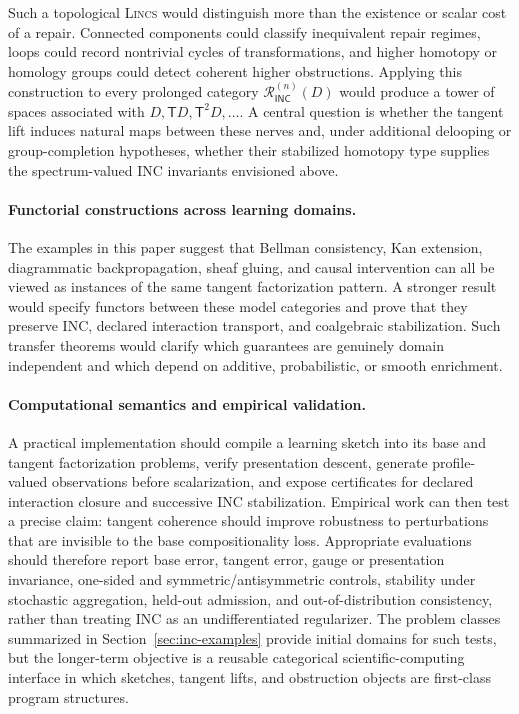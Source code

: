 \documentclass{article}
\newcommand{\T}{\mathsf{T}}
\newcommand{\INC}{\mathsf{INC}}
\begin{document}
Such a topological \textsc{Lincs}   would distinguish more than the existence or scalar
cost of a repair.  Connected components could classify inequivalent repair
regimes, loops could record nontrivial cycles of transformations, and higher
homotopy or homology groups could detect coherent higher obstructions.  Applying
this construction to every prolonged category
$\mathcal R_{\INC}^{(n)}(D)$ would produce a tower of spaces associated with
$D,\T D,\T^2D,\ldots$.  A central question is whether the tangent lift induces
natural maps between these nerves and, under additional delooping or
group-completion hypotheses, whether their stabilized homotopy type supplies
the spectrum-valued INC invariants envisioned above.

\paragraph{Functorial constructions across learning domains.}
The examples in this paper suggest that Bellman consistency, Kan extension,
diagrammatic backpropagation, sheaf gluing, and causal intervention can all be
viewed as instances of the same tangent factorization pattern.  A stronger
result would specify functors between these model categories and prove that
they preserve INC, declared interaction transport, and coalgebraic stabilization.  Such
transfer theorems would clarify which guarantees are genuinely domain
independent and which depend on additive, probabilistic, or smooth enrichment.

\paragraph{Computational semantics and empirical validation.}
A practical implementation should compile a learning sketch into its base and
tangent factorization problems, verify presentation descent, generate
profile-valued observations before scalarization, and expose certificates for
declared interaction closure and successive INC stabilization.
Empirical work can then test a precise claim: tangent coherence should improve
robustness to perturbations that are invisible to the base compositionality
loss.  Appropriate evaluations should therefore report base error, tangent
error, gauge or presentation invariance, one-sided and
symmetric/antisymmetric controls, stability under stochastic aggregation,
held-out admission, and out-of-distribution consistency, rather than treating
INC as an undifferentiated regularizer.  The problem classes summarized in
Section~\ref{sec:inc-examples} provide initial domains for such tests, but
the longer-term objective is a reusable categorical scientific-computing
interface in which sketches, tangent lifts, and obstruction objects are
first-class program structures.
\end{document}
